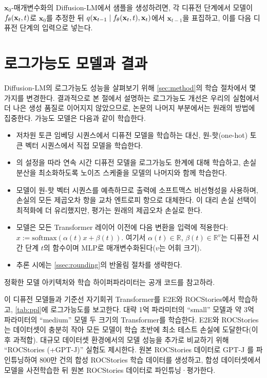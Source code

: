 \documentclass{article}
\newcommand{\cx}[1]{\mathbf{x}_{#1}}
\begin{document}
$\cx{0}$-매개변수화의 Diffusion-LM에서 샘플을 생성하려면, 각 디퓨전 단계에서 모델이 $\xxtheta (\cx{t}, t)$로 $\cx{0}$를 추정한 뒤 $q(\cx{t-1} \mid \xxtheta (\cx{t}, t), \cx{t})$에서 $\cx{t-1}$을 표집하고, 이를 다음 디퓨전 단계의 입력으로 넣는다.






\section{로그가능도 모델과 결과}
\label{app:simplex}

Diffusion-LM의 로그가능도 성능을 살펴보기 위해 \cref{sec:method}의 학습 절차에서 몇 가지를 변경한다.
결과적으로 본 절에서 설명하는 로그가능도 개선은 우리의 실험에서 더 나은 생성 품질로 이어지지 않았으므로, 논문의 나머지 부분에서는 원래의 방법에 집중한다.
가능도 모델은 다음과 같이 학습한다.
\begin{itemize}
    \item 저차원 토큰 임베딩 시퀀스에서 디퓨전 모델을 학습하는 대신, 원-핫(one-hot) 토큰 벡터 시퀀스에서 직접 모델을 학습한다.
    \item \citet{kingma2021variational}의 설정을 따라 연속 시간 디퓨전 모델을 로그가능도 한계에 대해 학습하고, 손실 분산을 최소화하도록 노이즈 스케줄을 모델의 나머지와 함께 학습한다.
    \item 모델이 원-핫 벡터 시퀀스를 예측하므로 출력에 소프트맥스 비선형성을 사용하며, 손실의 모든 제곱오차 항을 교차 엔트로피 항으로 대체한다. 이 대리 손실 선택이 최적화에 더 유리했지만, 평가는 원래의 제곱오차 손실로 한다.
    \item 모델은 모든 Transformer 레이어 이전에 다음 변환을 입력에 적용한다: $x := \mathrm{softmax}(\alpha(t) x + \beta(t))$. 여기서 $\alpha(t) \in \mathbb{R}$, $\beta(t) \in \mathbb{R}^v$는 디퓨전 시간 단계 $t$의 함수이며 MLP로 매개변수화된다($v$는 어휘 크기).
    \item 추론 시에는 \cref{ssec:rounding}의 반올림 절차를 생략한다.
\end{itemize}
정확한 모델 아키텍처와 학습 하이퍼파라미터는 공개 코드를 참고하라.

이 디퓨전 모델들과 기준선 자기회귀 Transformer를 E2E와 ROCStories에서 학습하고, \cref{tab:ppl}에 로그가능도를 보고한다.
대략 1억 파라미터의 ``small'' 모델과 약 3억 파라미터의 ``medium'' 모델 두 크기의 Transformer를 학습한다.
E2E와 ROCStories는 데이터셋이 충분히 작아 모든 모델이 학습 초반에 최소 테스트 손실에 도달한다(이후 과적합).
대규모 데이터셋 환경에서의 모델 성능을 추가로 비교하기 위해 ``ROCStories (+GPT-J)'' 실험도 제시한다. 원본 ROCStories 데이터로 GPT-J \citep{gpt-j}를 파인튜닝하여 800만 건의 합성 ROCStories 학습 데이터를 생성하고, 합성 데이터셋에서 모델을 사전학습한 뒤 원본 ROCStories 데이터로 파인튜닝·평가한다.
\end{document}
